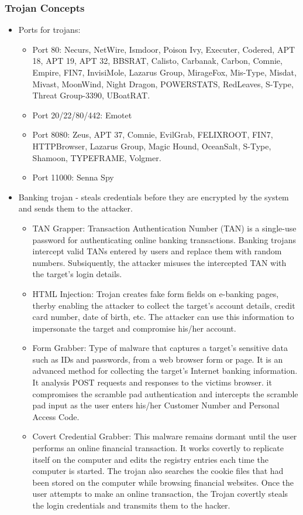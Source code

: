\subsubsection{Trojan Concepts}
\begin{itemize}
    \item Ports for trojans:
    \begin{itemize}
        \item Port 80: Necurs, NetWire, Ismdoor, Poison Ivy, Executer, Codered, APT 18, APT 19, APT 32, BBSRAT, Calisto, Carbanak, Carbon, Comnie, Empire, FIN7, InvisiMole, Lazarus Group, MirageFox, Mis-Type, Misdat, Mivast, MoonWind, Night Dragon, POWERSTATS, RedLeaves, S-Type, Threat Group-3390, UBoatRAT.
        \item Port 20/22/80/442: Emotet
        \item Port 8080: Zeus, APT 37, Comnie, EvilGrab, FELIXROOT, FIN7, HTTPBrowser, Lazarus Group, Magic Hound, OceanSalt, S-Type, Shamoon, TYPEFRAME, Volgmer.
        \item Port 11000: Senna Spy
    \end{itemize}
    \item Banking trojan - steals credentials before they are encrypted by the system and sends them to the attacker.
    \begin{itemize}
        \item TAN Grapper: Transaction Authentication Number (TAN) is a single-use password for authenticating online banking transactions. Banking trojans intercept valid TANs entered by users and replace them with random numbers. Subsiquently, the attacker misuses the intercepted TAN with the target's login details.
        \item HTML Injection: Trojan creates fake form fields on e-banking pages, therby enabling the attacker to collect the target's account details, credit card number, date of birth, etc. The attacker can use this information to impersonate the target and compromise his/her account.
        \item Form Grabber: Type of malware that captures a target's sensitive data such as IDs and passwords, from a web browser form or page. It is an advanced method for collecting the target's Internet banking information. It analysis POST requests and responses to the victims browser. it compromises the scramble pad authentication and intercepts the scramble pad input as the user enters his/her Customer Number and Personal Access Code.
        \item Covert Credential Grabber: This malware remains dormant until the user performs an online financial transaction. It works covertly to replicate itself on the computer and edits the registry entries each time the computer is started. The trojan also searches the cookie files that had been stored on the computer while browsing financial websites. Once the user attempts to make an online transaction, the Trojan covertly steals the login credentials and transmits them to the hacker.

\end{itemize}
\end{itemize}
